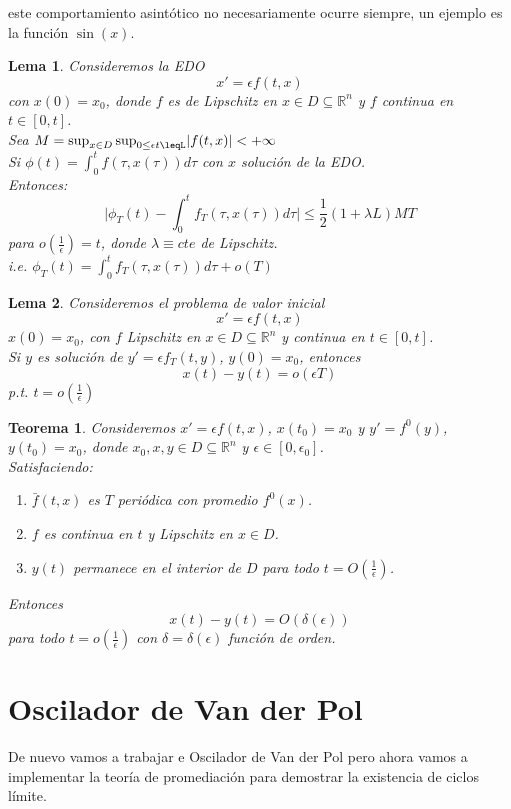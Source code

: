 \documentclass[12pt, a4paper]{report}
\providecommand{\abs}[1]{\lvert#1\rvert}
\newtheorem{lemma}{Lema}
\newtheorem{theorem}{Teorema}
\begin{document}
\newpage

este comportamiento asintótico no necesariamente ocurre siempre, un ejemplo es la función $\sin(x)$. 

\begin{lemma}
	Consideremos la EDO
	$$
		x'=\epsilon f(t,x)
	$$
	con $x(0)=x_0$, donde $f$ es de Lipschitz en $x\in D\subseteq\mathbb{R}^n$
	y $f$ continua en $t\in[0,t]$.\\
	Sea $M=\sup_{x\in D} \sup_{0\leq\epsilon t\leqL} \abs{f(t,x)}<+\infty$
	\\Si $\phi(t)=\int_{0}^{t}f(\tau,x(\tau))d\tau$ con $x$ solución de la EDO.
	\\Entonces:
	$$
		\abs{\phi_T(t)-\int_{0}^{t}f_T(\tau,x(\tau))d\tau}\leq\frac{1}{2}(1+\lambda L)MT
	$$
	para $o(\frac{1}{\epsilon})=t$, donde $\lambda\equiv cte$ de Lipschitz.
	\\i.e. $\phi_T(t)=\int_{0}^{t}f_T(\tau,x(\tau))d\tau+o(T)$
\end{lemma}

\begin{lemma}
	Consideremos el problema de valor inicial
	$$
		x'=\epsilon f(t,x)
	$$
	$x(0)=x_0$, con $f$ Lipschitz en $x\in D\subseteq\mathbb{R}^n$ y continua
	en $t\in[0,t]$. \\
	Si $y$ es solución de $y'=\epsilon f_T(t,y)$, $y(0)=x_0$, entonces
	$$
		x(t)-y(t)=o(\epsilon T)
	$$
	p.t. $t=o(\frac{1}{\epsilon})$
\end{lemma}

\begin{theorem}
	Consideremos $x'=\epsilon f(t,x)$, $x(t_0)=x_0$ y $y'=f^0(y)$, $y(t_0)=x_0$,
	donde $x_0,x,y\in D\subseteq\mathbb{R}^n$ y $\epsilon\in[0,\epsilon_0]$.\\

	Satisfaciendo:
	\begin{enumerate}
		\item $\bar{f}(t,x)$ es $T$ periódica con promedio $f^0(x)$.
		\item $f$ es continua en $t$ y Lipschitz en $x\in D$.
		\item $y(t)$ permanece en el interior de $D$ para todo $t=O(\frac{1}{\epsilon})$.
	\end{enumerate}
	Entonces
	$$x(t)-y(t)=O(\delta(\epsilon))$$
	para todo $t=o(\frac{1}{\epsilon})$ con $\delta=\delta(\epsilon)$ función de orden.
\end{theorem}

\section{Oscilador de Van der Pol}
De nuevo vamos a trabajar e Oscilador de Van der Pol pero ahora vamos a implementar la teoría de promediación para demostrar la existencia de ciclos límite.\\
\end{document}
